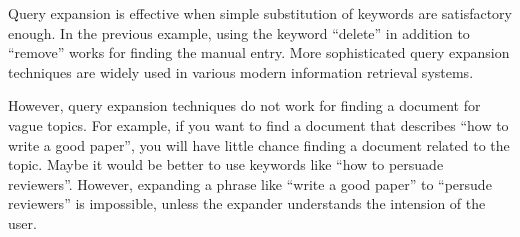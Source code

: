 \documentclass[manuscript,anonymous,review]{acmart}
\begin{document}
% 

Query expansion is effective when simple substitution of keywords are satisfactory enough.
In the previous example, using the keyword ``delete'' in addition to ``remove'' works
for finding the manual entry.
More sophisticated query expansion techniques are widely used in various modern
information retrieval systems.

However, query expansion techniques do not work for finding a document for vague topics.
For example, if you want to find a document that describes ``how to write a good paper'',
you will have little chance finding a document related to the topic.
Maybe it would be better to use keywords like ``how to persuade reviewers''.
However, expanding a phrase like ``write a good paper'' to ``persude reviewers'' is impossible,
unless the expander understands the intension of the user.




\end{document}

